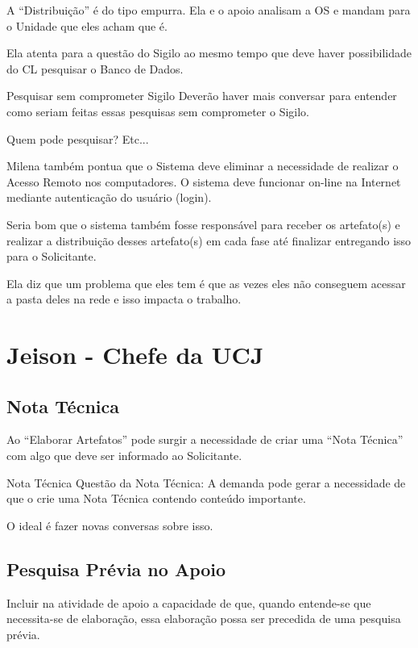A ``Distribuição'' é do tipo empurra. Ela e o apoio analisam a OS e mandam para o Unidade que eles acham que é.

Ela atenta para a questão do Sigilo ao mesmo tempo que deve haver possibilidade do CL pesquisar o Banco de Dados. 

\begin{importante}{Pesquisar sem comprometer Sigilo}
	Deverão haver mais conversar para entender como seriam feitas essas pesquisas sem comprometer o Sigilo.
	
	Quem pode pesquisar? Etc...	
\end{importante}

Milena também pontua que o Sistema deve eliminar a necessidade de realizar o Acesso Remoto nos computadores. O sistema deve funcionar on-line na Internet mediante autenticação do usuário (login). 

Seria bom que o sistema também fosse responsável para receber os artefato(s) e realizar a distribuição desses artefato(s) em cada fase até finalizar entregando isso para o Solicitante.

Ela diz que um problema que eles tem é que as vezes eles não conseguem acessar a pasta deles na rede e isso impacta o trabalho.


\section{Jeison - Chefe da UCJ}

\subsection{Nota Técnica}

Ao ``Elaborar Artefatos'' pode surgir a necessidade de criar uma ``Nota Técnica'' com algo que deve ser informado ao Solicitante.

\begin{importante}{Nota Técnica}
	Questão da Nota Técnica: A demanda pode gerar a necessidade de que o \CL crie uma Nota Técnica contendo conteúdo importante.
	
	O ideal é fazer novas conversas sobre isso.		
\end{importante}

\subsection{Pesquisa Prévia no Apoio}

Incluir na atividade de apoio a capacidade de que, quando entende-se que necessita-se de elaboração, essa elaboração possa ser precedida de uma pesquisa prévia. 

